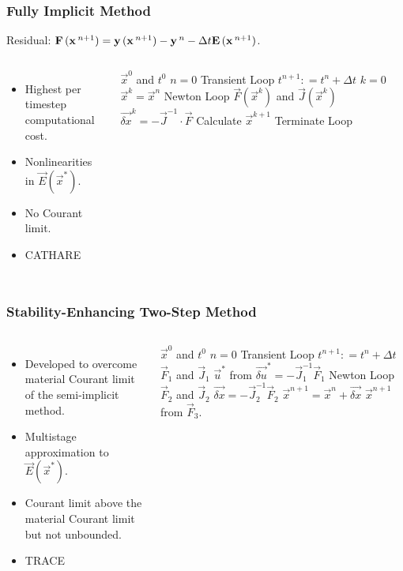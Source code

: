 \documentclass[compress,xcolor=table]{beamer}
\begin{document}
\begin{frame}
\frametitle{Fully Implicit Method}

Residual: $\vec{F}(\vec{x}^{n+1}) = \vec{y}(\vec{x}^{n+1}) - \vec{y}^{n} - \dt{} \vec{E}(\vec{x}^{n+1})$.

\begin{columns}

\begin{itemize}
\item{Highest per timestep computational cost.}
\item{Nonlinearities in $\vec{E}(\vec{x}^{*})$.}
\item{No Courant limit.}
\item{CATHARE}
\end{itemize}


\begin{algorithmic}
\scriptsize
\Require $\vec{x}^{0}$ and $t^{0}$
\Set $n = 0$
\Loop \; Transient Loop
    \Set $t^{n+1} : = t^{n} + \Delta t$
    \Set $k = 0$
    \Set $\vec{x}^{k} = \vec{x}^{n}$
    \Loop \; Newton Loop
		\Calculate $\vec{F}(\vec{x}^{k})$ and $\vec{J}(\vec{x}^{k})$
		\Calculate $\vec{\delta x}^k = - \vec{J}^{-1}\cdot\vec{F}$
		\BlackBox Calculate $\vec{x}^{k+1}$
		\BlackBox Terminate Loop
\end{algorithmic}

\end{columns}
\end{frame}
\begin{frame}
\frametitle{Stability-Enhancing Two-Step Method}

\begin{columns}

\begin{itemize}
\item{Developed to overcome material Courant limit of the semi-implicit method.}
\item{Multistage approximation to $\vec{E}(\vec{x}^{*})$.}
\item{Courant limit above the material Courant limit but not unbounded.}
\item{TRACE}
\end{itemize}

\begin{algorithmic}
\scriptsize
\Require $\vec{x}^{0}$ and $t^{0}$
\Set $n = 0$
\Loop \; Transient Loop
    \State $t^{n+1} : = t^{n} + \Delta t$
	\Calculate $\vec{F}_1$ and $\vec{J}_1$
	\Calculate $\vec{u}^{*}$ from $\vec{\delta u}^{*} = -\vec{J}^{-1}_1\vec{F}_1$
	\Loop \; Newton Loop
		\Calculate $\vec{F}_2$ and $\vec{J}_2$
		\Calculate $\vec{\delta x} = - \vec{J}_2^{-1}\vec{F}_2$
		\Calculate $\vec{x}^{n+1} = \vec{x}^{n} + \vec{\delta x}$
	\EndLoop
	\Calculate $\vec{x}^{n+1}$ from $\vec{F}_3$.
\end{algorithmic}

\end{columns}
\end{frame}
\end{document}
